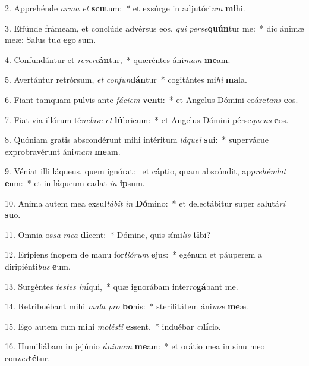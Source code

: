 2. Apprehénde \textit{ar}\textit{ma} \textit{et} \textbf{scu}tum:~*  et exsúrge in adjutóri\textit{um} \textbf{mi}hi.\

3. Effúnde frámeam, et conclúde advérsus eos, \textit{qui} \textit{per}\textit{se}\textbf{quún}tur me:~*  dic ánimæ meæ: Salus tu\textit{a} \textbf{e}go sum.\

4. Confundántur et \textit{re}\textit{ve}\textit{re}\textbf{án}tur,~*  quæréntes áni\textit{mam} \textbf{me}am.\

5. Avertántur retrórsum, \textit{et} \textit{con}\textit{fun}\textbf{dán}tur~*  cogitántes mi\textit{hi} \textbf{ma}la.\

6. Fiant tamquam pulvis ante \textit{fá}\textit{ci}\textit{em} \textbf{ven}ti:~*  et Angelus Dómini coárc\textit{tans} \textbf{e}os.\

7. Fiat via illórum té\textit{ne}\textit{bræ} \textit{et} \textbf{lú}bricum:~*  et Angelus Dómini pérse\textit{quens} \textbf{e}os.\

8. Quóniam gratis abscondérunt mihi intéritum \textit{lá}\textit{que}\textit{i} \textbf{su}i:~*  supervácue exprobravérunt áni\textit{mam} \textbf{me}am.\

9. Véniat illi láqueus, quem ignórat: \dag\  et cáptio, quam abscóndit, ap\textit{pre}\textit{hén}\textit{dat} \textbf{e}um:~*  et in láqueum cadat \textit{in} \textbf{ip}sum.\

10. Anima autem mea exsul\textit{tá}\textit{bit} \textit{in} \textbf{Dó}mino:~*  et delectábitur super salutá\textit{ri} \textbf{su}o.\

11. Omnia os\textit{sa} \textit{me}\textit{a} \textbf{di}cent:~*  Dómine, quis sími\textit{lis} \textbf{ti}bi?\

12. Erípiens ínopem de manu for\textit{ti}\textit{ó}\textit{rum} \textbf{e}jus:~*  egénum et páuperem a diripiénti\textit{bus} \textbf{e}um.\

13. Surgéntes \textit{tes}\textit{tes} \textit{in}\textbf{í}qui,~*  quæ ignorábam inter\textit{ro}\textbf{gá}bant me.\

14. Retribuébant mihi \textit{ma}\textit{la} \textit{pro} \textbf{bo}nis:~*  sterilitátem áni\textit{mæ} \textbf{me}æ.\

15. Ego autem cum mihi \textit{mo}\textit{lés}\textit{ti} \textbf{es}sent,~*  induébar \textit{ci}\textbf{lí}cio.\

16. Humiliábam in jejúnio \textit{á}\textit{ni}\textit{mam} \textbf{me}am:~*  et orátio mea in sinu meo con\textit{ver}\textbf{té}tur.\

